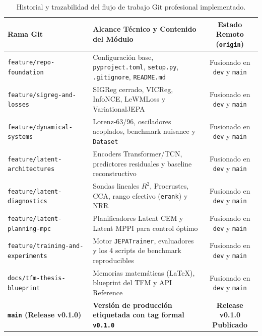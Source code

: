 \documentclass[10pt,a4paper]{article}
\begin{document}
\begin{table}[H]
\centering
\footnotesize
\begin{tabularx}{\textwidth}{l p{6.5cm} c}
\toprule
\textbf{Rama Git} & \textbf{Alcance Técnico y Contenido del Módulo} & \textbf{Estado Remoto (\texttt{origin})} \\
\midrule
\texttt{feature/repo-foundation} & Configuración base, \texttt{pyproject.toml}, \texttt{setup.py}, \texttt{.gitignore}, \texttt{README.md} & Fusionado en \texttt{dev} y \texttt{main} \\
\texttt{feature/sigreg-and-losses} & SIGReg cerrado, VICReg, InfoNCE, LeWMLoss y VariationalJEPA & Fusionado en \texttt{dev} y \texttt{main} \\
\texttt{feature/dynamical-systems} & Lorenz-63/96, osciladores acoplados, benchmark nuisance y \texttt{Dataset} & Fusionado en \texttt{dev} y \texttt{main} \\
\texttt{feature/latent-architectures} & Encoders Transformer/TCN, predictores residuales y baseline reconstructivo & Fusionado en \texttt{dev} y \texttt{main} \\
\texttt{feature/latent-diagnostics} & Sondas lineales $R^2$, Procrustes, CCA, rango efectivo (\texttt{erank}) y NRR & Fusionado en \texttt{dev} y \texttt{main} \\
\texttt{feature/latent-planning-mpc} & Planificadores Latent CEM y Latent MPPI para control óptimo & Fusionado en \texttt{dev} y \texttt{main} \\
\texttt{feature/training-and-experiments} & Motor \texttt{JEPATrainer}, evaluadores y los 4 scripts de benchmark reproducibles & Fusionado en \texttt{dev} y \texttt{main} \\
\texttt{docs/tfm-thesis-blueprint} & Memorias matemáticas (\LaTeX), blueprint del TFM y API Reference & Fusionado en \texttt{dev} y \texttt{main} \\
\textbf{\texttt{main} (Release v0.1.0)} & \textbf{Versión de producción etiquetada con tag formal \texttt{v0.1.0}} & \textbf{Release v0.1.0 Publicado} \\
\bottomrule
\end{tabularx}
\caption{Historial y trazabilidad del flujo de trabajo Git profesional implementado.}
\end{table}
\end{document}
